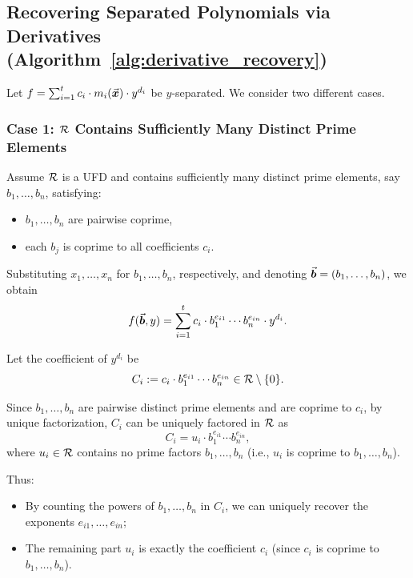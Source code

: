 \documentclass{article}
\numberwithin{equation}{section}
\begin{document}
\subsection{Recovering Separated Polynomials via Derivatives (Algorithm~\ref{alg:derivative_recovery})}
\label{sec:recovery}

Let
%
$f = \sum_{i=1}^{t} c_i \cdot m_i(\vec{\boldsymbol{x}}) \cdot y^{d_i}$
%
be $y$-separated. We consider two different cases.

\subsubsection*{Case 1: ${\mathcal{R}}$ Contains Sufficiently Many Distinct Prime Elements}

Assume ${\mathcal{R}}$ is a UFD and contains sufficiently many distinct prime elements, say $b_1, \dots, b_n$, satisfying:
\begin{itemize}
\item[(1)] $b_1, \dots, b_n$ are pairwise coprime,
\item[(2)] each $b_j$ is coprime to all coefficients $c_i$.
\end{itemize}

Substituting $x_1, \dots, x_n$ for $b_1, \dots, b_n$, respectively, and denoting $\vec{\boldsymbol{b}} = (b_1, \dots, b_n)$, we obtain
\[
f(\vec{\boldsymbol{b}}, y) = \sum_{i=1}^{t} c_i \cdot b_1^{e_{i1}} \cdots b_n^{e_{in}} \cdot y^{d_i}.
\]

Let the coefficient of $y^{d_i}$ be
\[
C_i := c_i \cdot b_1^{e_{i1}} \cdots b_n^{e_{in}} \in {\mathcal{R}} \setminus \{0\}.
\]

Since $b_1, \dots, b_n$ are pairwise distinct prime elements and are coprime to $c_i$, by unique factorization, $C_i$ can be uniquely factored in ${\mathcal{R}}$ as
\[
C_i = u_i \cdot b_1^{e_{i1}} \cdots b_n^{e_{in}},
\]
where $u_i \in {\mathcal{R}}$ contains no prime factors $b_1, \dots, b_n$ (i.e., $u_i$ is coprime to $b_1, \dots, b_n$).

Thus:
\begin{itemize}
\item By counting the powers of $b_1, \dots, b_n$ in $C_i$, we can uniquely recover the exponents $e_{i1}, \dots, e_{in}$;
\item The remaining part $u_i$ is exactly the coefficient $c_i$ (since $c_i$ is coprime to $b_1, \dots, b_n$).
\end{itemize}
\end{document}

